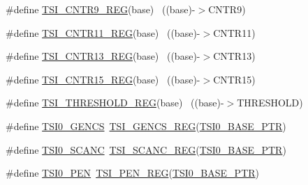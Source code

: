 \begin{DoxyCompactItemize}
\item 
\#define \hyperlink{group___t_s_i___register___accessor___macros_ga47c15fa313e21645ab38cf808bd08abb}{T\+S\+I\+\_\+\+C\+N\+T\+R9\+\_\+\+R\+EG}(base)                                        ~((base)-\/$>$C\+N\+T\+R9)
\item 
\#define \hyperlink{group___t_s_i___register___accessor___macros_gabb3ec6c9ffd38a29d4917c9c74047087}{T\+S\+I\+\_\+\+C\+N\+T\+R11\+\_\+\+R\+EG}(base)                                      ~((base)-\/$>$C\+N\+T\+R11)
\item 
\#define \hyperlink{group___t_s_i___register___accessor___macros_ga4781f0cae7aee00361b1d6dd24ebb375}{T\+S\+I\+\_\+\+C\+N\+T\+R13\+\_\+\+R\+EG}(base)                                      ~((base)-\/$>$C\+N\+T\+R13)
\item 
\#define \hyperlink{group___t_s_i___register___accessor___macros_ga6999a403171b9b12a3caa9d5c0da77b6}{T\+S\+I\+\_\+\+C\+N\+T\+R15\+\_\+\+R\+EG}(base)                                      ~((base)-\/$>$C\+N\+T\+R15)
\item 
\#define \hyperlink{group___t_s_i___register___accessor___macros_ga2eef7cbc055e4e7eead54c59a1bda753}{T\+S\+I\+\_\+\+T\+H\+R\+E\+S\+H\+O\+L\+D\+\_\+\+R\+EG}(base)                                ~((base)-\/$>$T\+H\+R\+E\+S\+H\+O\+LD)
\item 
\#define \hyperlink{group___t_s_i___register___accessor___macros_gabe033284ba64fa3097ff12d10c0b5e85}{T\+S\+I0\+\_\+\+G\+E\+N\+CS}~\hyperlink{group___t_s_i___register___accessor___macros_gacb2292491464fa55b36996380b09077f}{T\+S\+I\+\_\+\+G\+E\+N\+C\+S\+\_\+\+R\+EG}(\hyperlink{group___t_s_i___peripheral_gaf98ea1cd15559446e0cfc1ae177751f6}{T\+S\+I0\+\_\+\+B\+A\+S\+E\+\_\+\+P\+TR})
\item 
\#define \hyperlink{group___t_s_i___register___accessor___macros_ga97a8ffede71c53512f5e1bdef2fac778}{T\+S\+I0\+\_\+\+S\+C\+A\+NC}~\hyperlink{group___t_s_i___register___accessor___macros_gaa04f34529d4fc762bc30470edc1d5f38}{T\+S\+I\+\_\+\+S\+C\+A\+N\+C\+\_\+\+R\+EG}(\hyperlink{group___t_s_i___peripheral_gaf98ea1cd15559446e0cfc1ae177751f6}{T\+S\+I0\+\_\+\+B\+A\+S\+E\+\_\+\+P\+TR})
\item 
\#define \hyperlink{group___t_s_i___register___accessor___macros_gad706463b129b8eb7c63be3d033eb5da6}{T\+S\+I0\+\_\+\+P\+EN}~\hyperlink{group___t_s_i___register___accessor___macros_gaf538119a9d15bb7ecc599ef0c8dccec8}{T\+S\+I\+\_\+\+P\+E\+N\+\_\+\+R\+EG}(\hyperlink{group___t_s_i___peripheral_gaf98ea1cd15559446e0cfc1ae177751f6}{T\+S\+I0\+\_\+\+B\+A\+S\+E\+\_\+\+P\+TR})
\item 

\end{DoxyCompactItemize}
